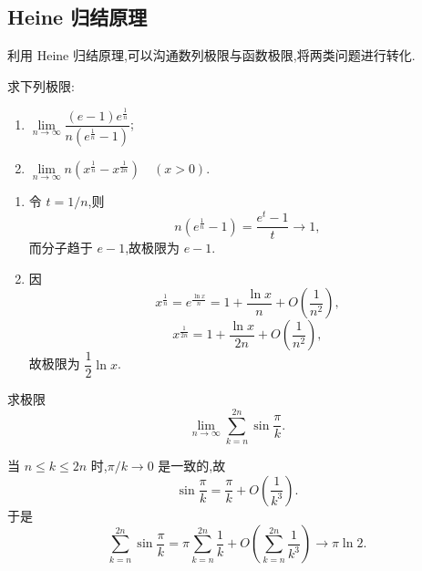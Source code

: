 \subsection{Heine 归结原理}

利用 Heine 归结原理,可以沟通数列极限与函数极限,将两类问题进行转化.

\begin{example}
    求下列极限:
    \begin{enumerate}
        \item $\displaystyle
                  \lim\limits_{n\to\infty}
                  \dfrac{(e-1)e^{\frac{1}{n}}}{n\left(e^{\frac{1}{n}}-1\right)}$;
        \item $\displaystyle
                  \lim\limits_{n\to\infty}
                  n\left(x^{\frac{1}{n}}-x^{\frac{1}{2n}}\right)\quad(x>0)$.
    \end{enumerate}
\end{example}
\exampleblank

\begin{solution}
    \begin{enumerate}
        \item 令 $t=1/n$,则
              \[
                  n\left(e^{\frac{1}{n}}-1\right)=\dfrac{e^t-1}{t}\longrightarrow1,
              \]
              而分子趋于 $e-1$,故极限为 $e-1$.
        \item 因
              \[
                  x^{\frac{1}{n}}=e^{\frac{\ln x}{n}}
                  =1+\dfrac{\ln x}{n}+O\left(\dfrac{1}{n^2}\right),
              \]
              \[
                  x^{\frac{1}{2n}}
                  =1+\dfrac{\ln x}{2n}+O\left(\dfrac{1}{n^2}\right),
              \]
              故极限为 $\dfrac{1}{2}\ln x$.
    \end{enumerate}
\end{solution}

\begin{example}
    求极限
    \[
        \lim\limits_{n\to\infty}
        \sum\limits_{k=n}^{2n}\sin\dfrac{\pi}{k}.
    \]
\end{example}
\exampleblank

\begin{solution}
    当 $n\leq k\leq2n$ 时,$\pi/k\to0$ 是一致的,故
    \[
        \sin\dfrac{\pi}{k}=\dfrac{\pi}{k}+O\left(\dfrac{1}{k^3}\right).
    \]
    于是
    \[
        \sum\limits_{k=n}^{2n}\sin\dfrac{\pi}{k}
        =\pi\sum\limits_{k=n}^{2n}\dfrac{1}{k}
        +O\left(\sum\limits_{k=n}^{2n}\dfrac{1}{k^3}\right)
        \longrightarrow\pi\ln2.
    \]
\end{solution}

